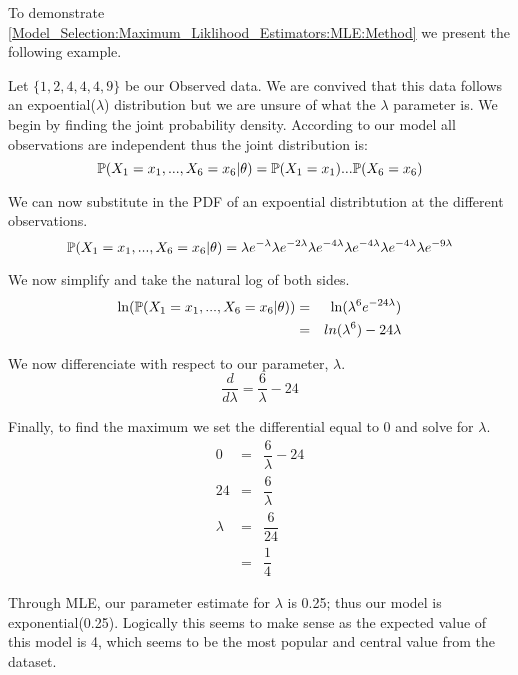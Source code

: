     \begin{example}
        \label{Model_Selection:Maximum_Liklihood_Estimators:MLE:Example}
        To demonstrate \ref{Model_Selection:Maximum_Liklihood_Estimators:MLE:Method} we present the following example. 

        Let $\{1,2,4,4,4,9\}$ be our Observed data. We are convived that this data follows an expoential($\lambda$) distribution but we are unsure of what the $\lambda$ parameter is. We begin by finding the joint probability density. According to our model all observations are independent thus the joint distribution is:
        \begin{equation}
            \mathbb{P}(X_1 = x_1,...,X_6=x_6|\theta) = \mathbb{P}(X_1 = x_1)...\mathbb{P}(X_6 = x_6)
        \end{equation}

        We can now substitute in the PDF of an expoential distribtution at the different observations.
        \begin{equation}
            \mathbb{P}(X_1 = x_1,...,X_6=x_6|\theta) = \lambda e^{-\lambda} \lambda e^{-2\lambda} \lambda e^{-4\lambda} \lambda e^{-4\lambda} \lambda e^{-4\lambda} \lambda e^{-9\lambda}
        \end{equation}

        We now simplify and take the natural log of both sides.
        \begin{eqnarray}
            \ln(\mathbb{P}(X_1 = x_1,...,X_6=x_6|\theta)) & = &  \ln(\lambda^6 e^{-24\lambda}) \\
            & = & ln(\lambda^6) - 24\lambda 
        \end{eqnarray}

        We now differenciate with respect to our parameter, $\lambda$.
        \begin{equation}
            \dfrac{d}{d\lambda} = \dfrac{6}{\lambda} - 24
        \end{equation}

        Finally, to find the maximum we set the differential equal to 0 and solve for $\lambda$.
        \begin{eqnarray}
            0 & = & \dfrac{6}{\lambda} - 24 \\
            24 & = & \dfrac{6}{\lambda} \\
            \lambda & = & \dfrac{6}{24} \\
            & = & \dfrac{1}{4}    
        \end{eqnarray}

        Through MLE, our parameter estimate for $\lambda$ is 0.25; thus our model is exponential(0.25). Logically this seems to make sense as the expected value of this model is 4, which seems to be the most popular and central value from the dataset.
    \end{example}


